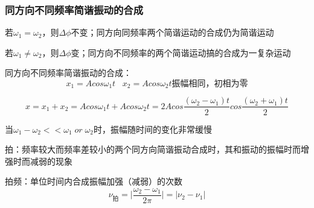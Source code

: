 \documentclass[UTF8]{article}
\begin{document}
\subsubsection{同方向不同频率简谐振动的合成}

    若$\omega_1 = \omega_2$，则$\Delta \phi$不变；同方向同频率两个简谐运动的合成仍为简谐运动

    若$\omega_1 \neq \omega_2$，则$\Delta \phi$变；同方向不同频率的两个简谐运动搞的合成为一复杂运动

    同方向不同频率简谐振动的合成：
    \[x_1 = Acos\omega_1 t\;\;\;x_2 = Acos\omega_2 t\mbox{振幅相同，初相为零}\]

    \[x = x_1 + x_2 = Acos\omega_1 t + Acos\omega_2 t = 2Acos\frac{(\omega_2 - \omega_1)t}{2}cos\frac{(\omega_2 + \omega_1)t}{2}\]

    当$\omega_1 - \omega_2<<\omega_1\; or \;\omega_2$时，振幅随时间的变化非常缓慢

    拍：频率较大而频率差较小的两个同方向简谐振动合成时，其和振动的振幅时而增强时而减弱的现象

    拍频：单位时间内合成振幅加强（减弱）的次数
    \[\nu_{\mbox{拍}} = \vert \frac{\omega_2 - \omega_1}{2\pi} \lvert = \vert \nu_2 - \nu_1 \lvert\]
    
\end{document}
